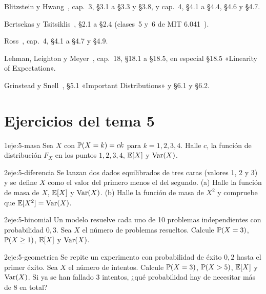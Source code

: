 \begin{lecturas}
\item Blitzstein y Hwang~\cite{bh}, cap.~3, §3.1 a §3.3 y §3.8, y cap.~4, §4.1 a §4.4, §4.6 y §4.7.
\item Bertsekas y Tsitsiklis~\cite{bt}, §2.1 a §2.4 (clases~5 y~6 de MIT 6.041~\cite{mit6041f10}).
\item Ross~\cite{ross}, cap.~4, §4.1 a §4.7 y §4.9.
\item Lehman, Leighton y Meyer~\cite{mcs}, cap.~18, §18.1 a §18.5, en especial §18.5 «Linearity of Expectation».
\item Grinstead y Snell~\cite{gs}, §5.1 «Important Distributions» y §6.1 y §6.2.
\end{lecturas}

\section*{Ejercicios del tema 5}

\begin{ejercicio}{1}{eje:5-masa}
Sea $X$ con $\mathbb{P}(X=k)=ck$ para $k=1,2,3,4$. Halle $c$, la función de distribución $F_X$ en los puntos $1,2,3,4$, $\mathbb{E}[X]$ y $\operatorname{Var}(X)$.
\end{ejercicio}

\begin{ejercicio}{2}{eje:5-diferencia}
Se lanzan dos dados equilibrados de tres caras (valores 1, 2 y 3) y se define $X$ como el valor del primero menos el del segundo. (a) Halle la función de masa de $X$, $\mathbb{E}[X]$ y $\operatorname{Var}(X)$. (b) Halle la función de masa de $X^{2}$ y compruebe que $\mathbb{E}[X^{2}]=\operatorname{Var}(X)$.
\end{ejercicio}

\begin{ejercicio}{2}{eje:5-binomial}
Un modelo resuelve cada uno de 10 problemas independientes con probabilidad $0{,}3$. Sea $X$ el número de problemas resueltos. Calcule $\mathbb{P}(X=3)$, $\mathbb{P}(X\ge1)$, $\mathbb{E}[X]$ y $\operatorname{Var}(X)$.
\end{ejercicio}

\begin{ejercicio}{2}{eje:5-geometrica}
Se repite un experimento con probabilidad de éxito $0{,}2$ hasta el primer éxito. Sea $X$ el número de intentos. Calcule $\mathbb{P}(X=3)$, $\mathbb{P}(X>5)$, $\mathbb{E}[X]$ y $\operatorname{Var}(X)$. Si ya se han fallado 3 intentos, ¿qué probabilidad hay de necesitar más de 8 en total?
\end{ejercicio}

